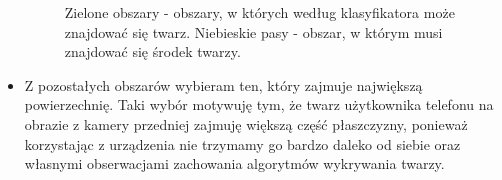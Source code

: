 \documentclass[10pt, a4paper]{article}
\begin{document}
\begin{itemize}
\begin{figure}[H]
\begin{center}
            \hspace{8mm}
        \end{center}
        \caption{Zielone obszary - obszary, w których według klasyfikatora może znajdować się twarz. Niebieskie pasy - obszar, w którym musi znajdować się środek twarzy.}
        \label{fig:face_boundary}
    \end{figure}
    
    
    
    \item Z pozostałych obszarów wybieram ten, który zajmuje największą powierzechnię. Taki wybór motywuję tym, że twarz użytkownika telefonu na obrazie z kamery przedniej zajmuję większą część płaszczyzny, ponieważ korzystając z urządzenia nie trzymamy go bardzo daleko od siebie oraz własnymi obserwacjami zachowania algorytmów wykrywania twarzy.
    

\end{itemize}
\end{document}
